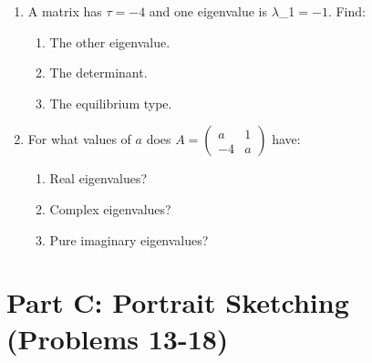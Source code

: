 \documentclass[12pt]{article}
\begin{document}
\begin{enumerate}[resume]
\item A matrix has $\tau = -4$ and one eigenvalue is $\lambda$_{1}$ = -1$. Find:
\begin{enumerate}[label=(\alph*)]
    \item The other eigenvalue.
    \item The determinant.
    \item The equilibrium type.
\end{enumerate}

\item For what values of $a$ does $A = \begin{pmatrix} a & 1 \\ -4 & a \end{pmatrix}$ have:
\begin{enumerate}[label=(\alph*)]
    \item Real eigenvalues?
    \item Complex eigenvalues?
    \item Pure imaginary eigenvalues?
\end{enumerate}
\end{enumerate}

\section*{Part C: Portrait Sketching (Problems 13-18)}
\end{document}
